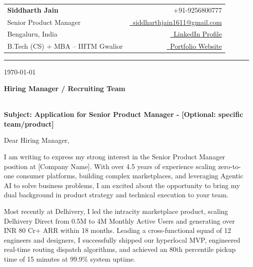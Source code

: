 \documentclass[a4paper,11pt]{article}
\makeatletter
\newcommand{\name}{Siddharth Jain}
\newcommand{\phone}{9256800777}
\newcommand{\emaila}{siddharthjain1611@gmail.com}
\makeatother
\begin{document}
\selectfont

{
\begin{tabularx}{\linewidth}{L r}
  \textbf{\Large \name} & {\raisebox{0.0\height}{\footnotesize \faPhone}\ +91-\phone}\\
  {Senior Product Manager} & \href{mailto:\emaila}{\raisebox{0.0\height}{\footnotesize \faEnvelope}\ {\emaila}} \\
  {Bengaluru, India} & \href{https://linkedin.com/in/siddharth-jain}{\raisebox{0.0\height}{\footnotesize \faLinkedin}\ {LinkedIn Profile}} \\  
  {B.Tech (CS) + MBA -- IIITM Gwalior} & \href{https://siddharthjain1611.github.io}{\raisebox{0.0\height}{\footnotesize \faGlobe}\ {Portfolio Website}}
\end{tabularx}
}

\vspace{0.2cm}
{\color{gray}\hrule}
\vspace{1cm}

\today

\vspace{0.5cm}

\textbf{Hiring Manager / Recruiting Team} \\
[Company Name] \\
[Company Address / Location]

\vspace{0.5cm}

\textbf{Subject: Application for Senior Product Manager - [Optional: specific team/product]}

\vspace{0.5cm}

Dear Hiring Manager,

I am writing to express my strong interest in the Senior Product Manager position at [Company Name]. With over 4.5 years of experience scaling zero-to-one consumer platforms, building complex marketplaces, and leveraging Agentic AI to solve business problems, I am excited about the opportunity to bring my dual background in product strategy and technical execution to your team.

Most recently at Delhivery, I led the intracity marketplace product, scaling Delhivery Direct from 0.5M to 4M Monthly Active Users and generating over INR 80 Cr+ ARR within 18 months. Leading a cross-functional squad of 12 engineers and designers, I successfully shipped our hyperlocal MVP, engineered real-time routing dispatch algorithms, and achieved an 80th percentile pickup time of 15 minutes at 99.9\% system uptime. 
\end{document}
